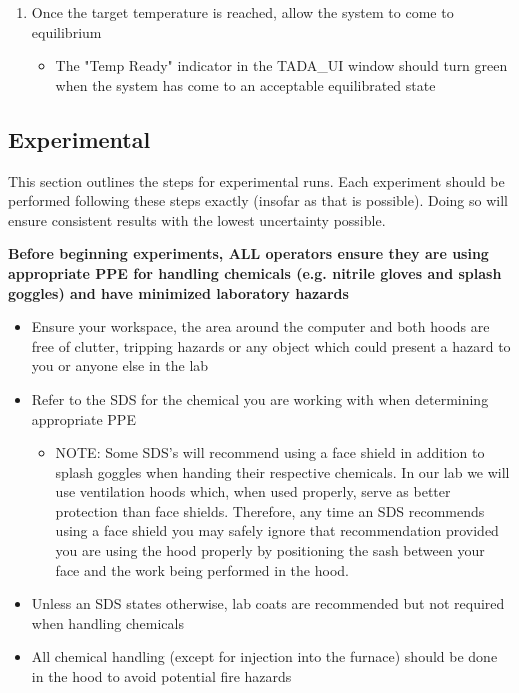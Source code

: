 \documentclass[letterpaper,11pt]{article}
\begin{document}
\begin{enumerate}
    \item Once the target temperature is reached, allow the system to come to 
        equilibrium
        \begin{itemize}
        \item The "Temp Ready" indicator in the TADA\_UI window should turn 
            green when the system has come to an acceptable equilibrated state
        \end{itemize}
    \end{enumerate}

    
\subsection{Experimental}
This section outlines the steps for experimental runs. Each experiment should be
performed following these steps exactly (insofar as that is possible). Doing so
will ensure consistent results with the lowest uncertainty possible.

\textbf{
Before beginning experiments, ALL operators ensure they are using
appropriate PPE for handling chemicals (e.g. nitrile gloves and splash goggles)
and have minimized laboratory hazards}

\begin{itemize}
\item Ensure your workspace, the area around the computer and 
    both hoods are free of clutter, tripping hazards or any object 
    which could present a hazard to you or anyone else in the lab
\item Refer to the SDS for the chemical you are working 
    with when determining appropriate PPE
    \begin{itemize}
    \item NOTE: Some SDS's will recommend using a face shield in 
        addition to splash goggles when handing their respective 
        chemicals. In our lab we will use ventilation hoods which, 
        when used properly, serve as better protection than face 
        shields. Therefore, any time an SDS recommends using a 
        face shield you may safely ignore that recommendation 
        provided you are using the hood properly by positioning the 
        sash between your face and the work being performed in 
        the hood.
    \end{itemize}
    
\item Unless an SDS states otherwise, lab coats are recommended but 
    not required when handling chemicals
\item All chemical handling (except for injection into the furnace) 
    should be done in the hood to avoid potential fire hazards
\end{itemize}
\end{document}
